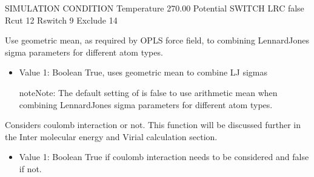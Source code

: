 \documentclass[letterpaper,10pt,english]{sphinxmanual}
\begin{document}
\begin{description}
\begin{itemize}
\begin{description}
\begin{itemize}
\end{itemize}

\begin{sphinxVerbatim}[commandchars=\\\{\}]
\PYGZsh{}\PYGZsh{}\PYGZsh{}\PYGZsh{}\PYGZsh{}\PYGZsh{}\PYGZsh{}\PYGZsh{}\PYGZsh{}\PYGZsh{}\PYGZsh{}\PYGZsh{}\PYGZsh{}\PYGZsh{}\PYGZsh{}\PYGZsh{}\PYGZsh{}\PYGZsh{}\PYGZsh{}\PYGZsh{}\PYGZsh{}\PYGZsh{}\PYGZsh{}\PYGZsh{}\PYGZsh{}\PYGZsh{}\PYGZsh{}\PYGZsh{}\PYGZsh{}\PYGZsh{}\PYGZsh{}\PYGZsh{}\PYGZsh{}
\PYGZsh{} SIMULATION CONDITION
\PYGZsh{}\PYGZsh{}\PYGZsh{}\PYGZsh{}\PYGZsh{}\PYGZsh{}\PYGZsh{}\PYGZsh{}\PYGZsh{}\PYGZsh{}\PYGZsh{}\PYGZsh{}\PYGZsh{}\PYGZsh{}\PYGZsh{}\PYGZsh{}\PYGZsh{}\PYGZsh{}\PYGZsh{}\PYGZsh{}\PYGZsh{}\PYGZsh{}\PYGZsh{}\PYGZsh{}\PYGZsh{}\PYGZsh{}\PYGZsh{}\PYGZsh{}\PYGZsh{}\PYGZsh{}\PYGZsh{}\PYGZsh{}\PYGZsh{}
Temperature   270.00
Potential     SWITCH
LRC           false
Rcut          12
Rswitch       9
Exclude       1\PYGZhy{}4
\end{sphinxVerbatim}

\end{description}

\end{itemize}

\item[{\sphinxcode{\sphinxupquote{VDWGeometricSigma}}}] \leavevmode
\sphinxAtStartPar
Use geometric mean, as required by OPLS force field, to combining Lennard\sphinxhyphen{}Jones sigma parameters for different atom types.
\begin{itemize}
\item {} 
\sphinxAtStartPar
Value 1: Boolean \sphinxhyphen{} True, uses geometric mean to combine L\sphinxhyphen{}J sigmas

\begin{sphinxadmonition}{note}{Note:}
\sphinxAtStartPar
The default setting of  is false to use arithmetic mean when combining Lennard\sphinxhyphen{}Jones sigma parameters for different atom types.
\end{sphinxadmonition}

\end{itemize}

\item[{\sphinxcode{\sphinxupquote{ElectroStatic}}}] \leavevmode
\sphinxAtStartPar
Considers coulomb interaction or not. This function will be discussed further in the Inter\sphinxhyphen{} molecular energy and Virial calculation section.
\begin{itemize}
\item {} 
\sphinxAtStartPar
Value 1: Boolean \sphinxhyphen{} True if coulomb interaction needs to be considered and false if not.


\end{itemize}
\end{description}
\end{document}
